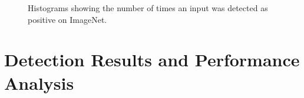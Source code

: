 \begin{figure}[p]
    \centering


     \caption{Histograms showing the number of times an input was detected as
        positive on ImageNet.}
    \label{fig:distributions_scores}
\end{figure}

\newpage

\section{Detection Results and Performance Analysis}
\label{sec:detection_results}

